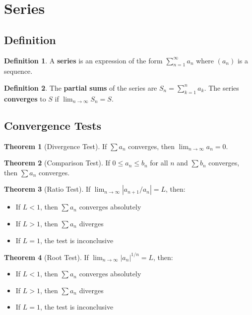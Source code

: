 \documentclass[11pt]{article}
\theoremstyle{definition}
\newtheorem{definition}{Definition}[section]
\newtheorem{theorem}{Theorem}[section]
\begin{document}
\section{Series}

\subsection{Definition}
\begin{definition}
A \textbf{series} is an expression of the form $\sum_{n=1}^{\infty} a_n$ where $(a_n)$ is a sequence.
\end{definition}

\begin{definition}
The \textbf{partial sums} of the series are $S_n = \sum_{k=1}^n a_k$. The series \textbf{converges} to $S$ if $\lim_{n \to \infty} S_n = S$.
\end{definition}

\subsection{Convergence Tests}
\begin{theorem}[Divergence Test]
If $\sum a_n$ converges, then $\lim_{n \to \infty} a_n = 0$.
\end{theorem}

\begin{theorem}[Comparison Test]
If $0 \leq a_n \leq b_n$ for all $n$ and $\sum b_n$ converges, then $\sum a_n$ converges.
\end{theorem}

\begin{theorem}[Ratio Test]
If $\lim_{n \to \infty} |a_{n+1}/a_n| = L$, then:
\begin{itemize}
    \item If $L < 1$, then $\sum a_n$ converges absolutely
    \item If $L > 1$, then $\sum a_n$ diverges
    \item If $L = 1$, the test is inconclusive
\end{itemize}
\end{theorem}

\begin{theorem}[Root Test]
If $\lim_{n \to \infty} |a_n|^{1/n} = L$, then:
\begin{itemize}
    \item If $L < 1$, then $\sum a_n$ converges absolutely
    \item If $L > 1$, then $\sum a_n$ diverges
    \item If $L = 1$, the test is inconclusive
\end{itemize}
\end{theorem}
\end{document}
